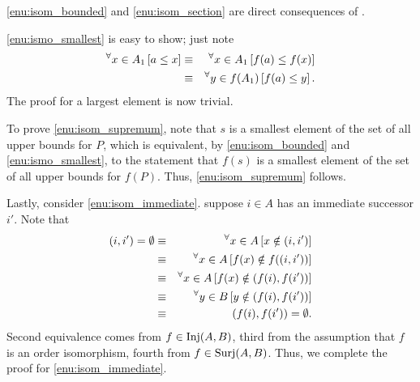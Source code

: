 \documentclass[a4paper,12pt]{article}
\begin{document}
\begin{prf}
	\ref{enu:isom_bounded}
	and
	\ref{enu:isom_section}
	are direct consequences of .
	
	\ref{enu:ismo_smallest} is easy to show; just note
	\begin{eqnarray*}
		{}^{\forall}   x \in A_1\left[ a \le x \right]
		&\equiv&
		{}^{\forall}   x \in A_1\left[ f(a) \le f(x) \right]\\
		&\equiv&
		{}^{\forall}   y \in f(A_1)\left[ f(a) \le y \right].
	\end{eqnarray*}
	The proof for a largest element is now trivial.
	
	To prove \ref{enu:isom_supremum},
	note that \( s \) is a smallest element of the set of all upper bounds for \( P \),
	which is equivalent, by \ref{enu:isom_bounded} and \ref{enu:ismo_smallest},
	to the statement that
	\( f(s) \) is a smallest element of the set of all upper bounds for \( f(P) \).
	Thus, \ref{enu:isom_supremum} follows.
	
	Lastly, consider \ref{enu:isom_immediate}.
	suppose \( i \in A \)
	has an immediate successor \( i' \).
	Note that
	\begin{eqnarray*}
		(i,i')= \emptyset
		&\equiv&
		{}^{\forall}  x\in A\left[ x \notin(i,i') \right]\\
		&\equiv&
		{}^{\forall}  x\in A\left[ f(x) \notin f((i,i')) \right]\\
		&\equiv&
		{}^{\forall}  x\in A\left[ f(x) \notin  \left( f(i),f(i') \right) \right]\\
		&\equiv&
		{}^{\forall}  y\in B\left[ y \notin  \left( f(i),f(i') \right) \right]\\
		&\equiv&
		\left( f(i),f(i') \right) = \emptyset.
	\end{eqnarray*}
	Second equivalence comes from \( f\in \mathrm{Inj}(A,B) \),
	third from the assumption that \( f \) is an order isomorphism,
	fourth from \( f \in \mathrm{Surj}(A,B) \).
	Thus, we complete the proof for \ref{enu:isom_immediate}.
\end{prf}
\end{document}
